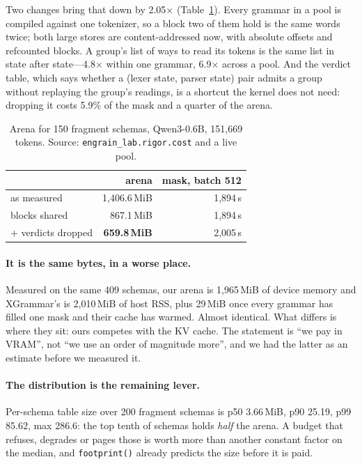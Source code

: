 \documentclass{article}
\begin{document}
Two changes bring that down by 2.05$\times$ (Table~\ref{tab:costs}). Every
grammar in a pool is compiled against one tokenizer, so a block two of them
hold is the same words twice; both large stores are content-addressed now, with
absolute offsets and refcounted blocks. A group's list of ways to read its
tokens is the same list in state after state---4.8$\times$ within one grammar,
6.9$\times$ across a pool. And the verdict table, which says whether a
(lexer state, parser state) pair admits a group without replaying the group's
readings, is a shortcut the kernel does not need: dropping it costs 5.9\% of
the mask and a quarter of the arena.

\begin{table}[t]
\caption{Arena for 150 fragment schemas, Qwen3-0.6B, 151{,}669 tokens.
Source: \texttt{engrain\_lab.rigor.cost} and a live pool.}
\label{tab:costs}
\vskip 0.1in
\begin{center}
\begin{small}
\begin{tabular}{lrr}
\toprule
 & arena & mask, batch 512 \\
\midrule
as measured & 1{,}406.6\,MiB & 1{,}894\,\textmu{}s \\
blocks shared & 867.1\,MiB & 1{,}894\,\textmu{}s \\
\quad + verdicts dropped & \textbf{659.8\,MiB} & 2{,}005\,\textmu{}s \\
\bottomrule
\end{tabular}
\end{small}
\end{center}
\vskip -0.1in
\end{table}

\paragraph{It is the same bytes, in a worse place.} Measured on the same 409
schemas, our arena is 1{,}965\,MiB of device memory and XGrammar's is
2{,}010\,MiB of host RSS, plus 29\,MiB once every grammar has filled one mask
and their cache has warmed. Almost identical. What differs is where they sit:
ours competes with the KV cache. The statement is ``we pay in VRAM'', not ``we
use an order of magnitude more'', and we had the latter as an estimate before
we measured it.

\paragraph{The distribution is the remaining lever.} Per-schema table size over
200 fragment schemas is p50 3.66\,MiB, p90 25.19, p99 85.62, max 286.6: the top
tenth of schemas holds \emph{half} the arena. A budget that refuses, degrades
or pages those is worth more than another constant factor on the median, and
\texttt{footprint()} already predicts the size before it is paid.
\end{document}
